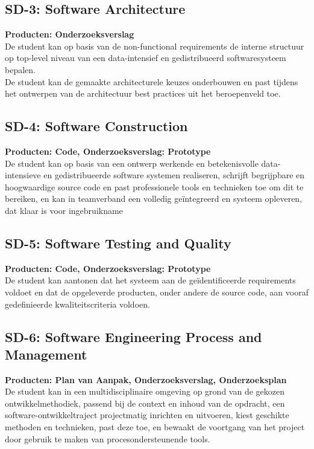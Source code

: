 \subsection{SD-3: Software Architecture}
\textbf{Producten: Onderzoeksverslag} \\
De student kan op basis van de non-functional requirements de interne structuur op top-level niveau van een data-intensief en gedistribueerd softwaresysteem bepalen.
\\
De student kan de gemaakte architecturele keuzes onderbouwen en past tijdens het ontwerpen van de architectuur best practices uit het beroepenveld toe.

\subsection{SD-4: Software Construction}
\textbf{Producten: Code, Onderzoeksverslag: Prototype} \\
De student kan op basis van een ontwerp werkende en betekenisvolle data- intensieve en gedistribueerde software systemen realiseren, schrijft begrijpbare en hoogwaardige source code en past professionele tools en technieken toe om dit te bereiken, en kan in teamverband een volledig geïntegreerd en systeem opleveren, dat klaar is voor ingebruikname

\subsection{SD-5: Software Testing and Quality}
\textbf{Producten: Code, Onderzoeksverslag: Prototype} \\
De student kan aantonen dat het systeem aan de geïdentificeerde requirements voldoet en dat de opgeleverde producten, onder andere de source code, aan vooraf gedefinieerde kwaliteitscriteria voldoen.

\newpage
\subsection{SD-6: Software Engineering Process and Management}
\textbf{Producten: Plan van Aanpak, Onderzoeksverslag, Onderzoeksplan} \\
De student kan in een multidisciplinaire omgeving op grond van de gekozen ontwikkelmethodiek, passend bij de context en inhoud van de opdracht, een software-ontwikkeltraject projectmatig inrichten en uitvoeren, kiest geschikte methoden en technieken, past deze toe, en bewaakt de voortgang van het project door gebruik te maken van procesondersteunende tools.

